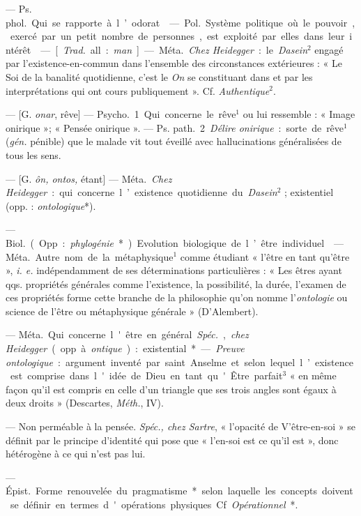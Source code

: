 \begin{itemize}[leftmargin=1cm, label=, itemsep=1pt]
 — \si{Ps. phol.} Qui se rapporte à l’odorat.

 — \si{Pol.} Système politique où le pouvoir, exercé par un
petit nombre de personnes, est exploité par elles dans leur intérêt.

 — [{\it Trad.} all. : {\it man}] — \si{Méta.} {\it Chez Heidegger} :
le {\it Dasein}$^2$ engagé par l’existence-en-commun dans l’ensemble des
circonstances extérieures : « Le Soi de la banalité quotidienne, c’est le
{\it On} se constituant dans et par les interprétations qui ont cours
publiquement ». Cf. {\it Authentique}$^2$.

 — [G. {\it onar}, rêve] — \si{Psycho.} 1. Qui concerne le
rêve$^1$ ou lui ressemble : « Image onirique »; « Pensée onirique ». —
\si{Ps. path.} 2 {\it Délire onirique} : sorte de rêve$^1$ ({\it gén.}
pénible) que le malade vit tout éveillé avec hallucinations généralisées de
tous les sens.

 — [G. {\it ôn, ontos,} étant] — \si{Méta.} {\it Chez
Heidegger} : qui concerne l’existence quotidienne du {\it Dasein}$^2$ ;
existentiel (opp. : {\it ontologique}*).

 — \si{Biol.} (Opp. : {\it phylogénie}*). Evolution biologique
de l’être individuel.

 — \si{Méta.} Autre nom de la métaphysique$^1$ comme étudiant «
l'être en tant qu'être », {\it i. e.} indépendamment de ses déterminations
particulières : « Les êtres ayant qqs. propriétés générales comme l’existence,
la possibilité, la durée, l’examen de ces propriétés forme cette branche de
la philosophie qu’on nomme l’{\it ontologie} ou science de l'être ou
métaphysique générale » (D’Alembert).

 — \si{Méta.} Qui concerne l'être en général. {\it Spéc.},
{\it chez Heidegger} (opp. à {\it ontique}) : existential*. — {\it Preuve
ontologique} : argument inventé par saint Anselme et selon lequel l’existence
est comprise dans l'idée de Dieu en tant qu'Être parfait$^3$ « en même façon
qu'il est compris en celle d’un triangle que ses trois angles sont égaux à
deux droits » (Descartes, {\it Méth.}, IV).

 — Non perméable à la pensée. {\it Spéc., chez Sartre}, «
l’opacité de V’être-en-soi » se définit par le principe d'identité qui pose
que « l’en-soi est ce qu’il est », donc hétérogène à ce qui n’est pas lui.

 —  \si{Épist.} Forme renouvelée du
pragmatisme* selon laquelle les concepts doivent se définir en termes
d'opérations physiques. Cf. {\it Opérationnel}*.


\end{itemize}
